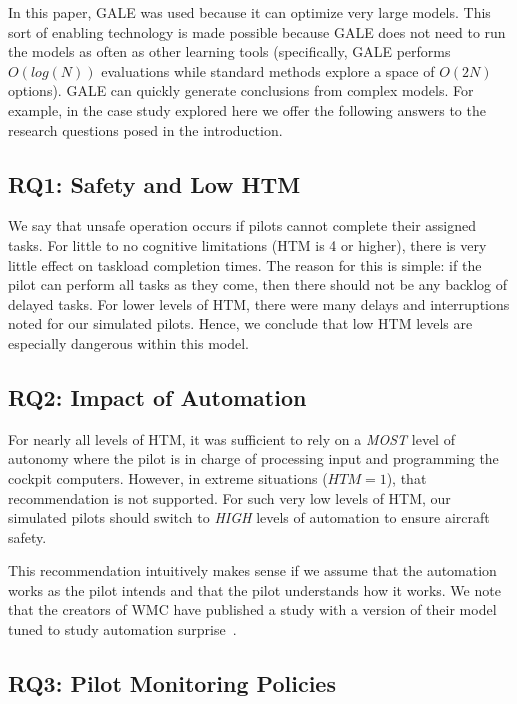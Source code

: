 \documentclass[journal]{IEEEtran}
\newenvironment{changed}{\par}{\par}
\begin{document}
In this paper, GALE was used because it can optimize very large models.  
This sort of enabling technology is made possible because GALE does not need to run the models as often as other learning tools (specifically, GALE performs $O(log(N))$ evaluations while standard methods explore a space of $O(2N)$ options).
GALE can quickly generate conclusions from complex models. 
For example, in the case study explored here we offer the following answers to the research questions posed in the introduction.




\subsection{RQ1: Safety and Low HTM}
We say that unsafe operation occurs if pilots cannot complete their assigned tasks.
For little to no cognitive limitations (HTM is 4 or higher), there is very little effect on taskload completion times.  
The reason for this is simple: if the pilot can perform all tasks as they come, then there should not be any backlog of delayed tasks.  
For lower levels of HTM, there were many delays and interruptions noted for our simulated pilots. 
Hence, we conclude that low HTM levels are especially dangerous within this model.

\subsection{RQ2: Impact of Automation}

For nearly all levels of HTM, it was sufficient to rely on a {\em MOST} level of autonomy where the pilot is in charge of processing input and programming the cockpit computers.
However, in extreme situations ($\mathit{HTM}=1$), that recommendation is not supported.  
For such very low levels of HTM, our simulated pilots should switch to {\em HIGH} levels of automation to ensure aircraft safety.
\begin{changed}
This recommendation intuitively makes sense if we assume that the automation works as the pilot intends
and that the pilot understands how it works.
 We note that the creators of WMC have  published a study with a version of their model tuned to study automation surprise~\cite{Gelman2014}.
\end{changed}

\subsection{RQ3: Pilot Monitoring Policies}
\end{document}
